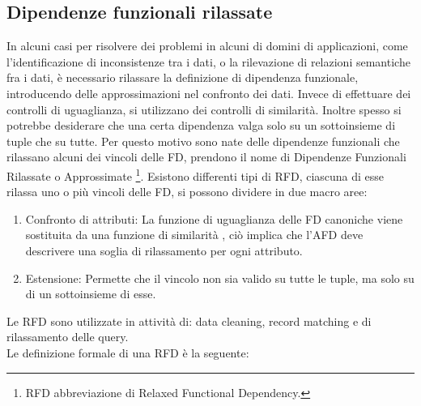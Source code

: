 \subsection{Dipendenze funzionali rilassate}
In alcuni casi per risolvere dei problemi in alcuni di domini di applicazioni, come l’identificazione di inconsistenze tra i dati, o la rilevazione di relazioni semantiche fra i dati,  è necessario rilassare la definizione di dipendenza funzionale, introducendo delle approssimazioni nel confronto dei dati. Invece di effettuare dei controlli di uguaglianza, si utilizzano dei controlli di similarità.
Inoltre spesso si potrebbe desiderare che una certa dipendenza valga solo su un sottoinsieme di tuple che su tutte.
Per questo motivo sono nate delle dipendenze funzionali che rilassano alcuni dei vincoli delle FD, prendono il nome di Dipendenze Funzionali Rilassate o Approssimate \footnote{RFD abbreviazione di Relaxed Functional Dependency.}.
Esistono differenti tipi di RFD, ciascuna di esse rilassa uno o più vincoli delle FD, si possono dividere in due macro aree:
\begin{enumerate}
	\item Confronto di attributi: La funzione di uguaglianza delle FD canoniche viene sostituita da una funzione di similarità , ciò implica che l'AFD deve descrivere una soglia di rilassamento per ogni attributo.
	\item Estensione: Permette che il vincolo non sia valido su tutte le tuple, ma solo su di un sottoinsieme di esse.
\end{enumerate}
Le RFD sono utilizzate in attività di: data cleaning, record matching e di rilassamento delle query.\\
Le definizione formale di una RFD è la seguente:
